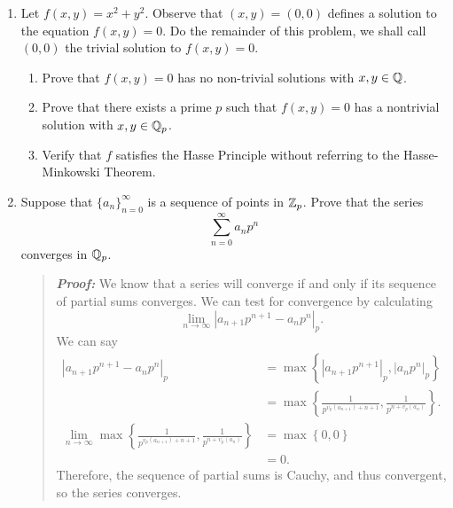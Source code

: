 \documentclass{hw}
\begin{document}
\begin{enumerate}
	\item Let $f(x,y)=x^2 + y^2$. Observe that $(x,y)=(0,0)$ defines a solution to the equation $f(x,y)=0$. Do the remainder of this problem, we shall call $(0,0)$ the trivial solution to $f(x,y)=0$.
	      \begin{enumerate}
	      	\item Prove that $f(x,y)=0$ has no non-trivial solutions with $x,y\in\mathbb{Q}$.
	      	\item Prove that there exists a prime $p$ such that $f(x,y)=0$ has a nontrivial solution with $x,y\in\mathbb{Q}_{p}$.
	      	\item Verify that $f$ satisfies the Hasse Principle without referring to the Hasse-Minkowski Theorem.
	      \end{enumerate}

	\item Suppose that $\{ a_{n} \}_{n=0}^{\infty}$ is a sequence of points in $\mathbb{Z}_{p}$. Prove that the series
	      \[
	      	\sum_{n=0}^{\infty}a_{n}p^{n}
	      \]
	      converges in $\mathbb{Q}_{p}$.
	      \begin{quote}
	      		\textit{\textbf{Proof:}} We know that a series will converge if and only if its sequence of partial sums converges. We can test for convergence by calculating
				\[
					\lim_{n\to\infty}\left|a_{n+1}p^{n+1}-a_{n}p^{n}\right|_{p}.
				\]
				We can say
				\begin{align*}
					\left|a_{n+1}p^{n+1}-a_{n}p^{n}\right|_{p} &= \max\left\{%
						\left|a_{n+1}p^{n+1}\right|_{p},\left|a_{n}p^{n}\right|_{p}%
					\right\}\\
					&= \max\left\{%
						\frac{1}{p^{v_{p}(a_{n+1}) + n + 1}}, \frac{1}{p^{n+v_{p}(a_{n})}}%
					\right\}.\\
					\lim_{n\to\infty}\max\left\{%
						\frac{1}{p^{v_{p}(a_{n+1}) + n + 1}}, \frac{1}{p^{n+v_{p}(a_{n})}}%
					\right\} &= \max\left\{0,0\right\}\\
					&= 0.
				\end{align*}
				Therefore, the sequence of partial sums is Cauchy, and thus convergent, so the series converges.
	      \end{quote}


\end{enumerate}
\end{document}
